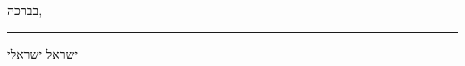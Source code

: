 \documentclass[letterpaper,11pt]{article}
\begin{document}
\begin{hebrew}
\vspace{20pt}
\begin{flushright}
בברכה,
\par\vspace{5pt}

\end{flushright}
\begin{flushright}
\vspace{-14mm}
\rule{0.25\textwidth}{0.5pt}
\par\vspace{5pt}
ישראל ישראלי
\end{flushright}
\end{hebrew}
\end{document}
